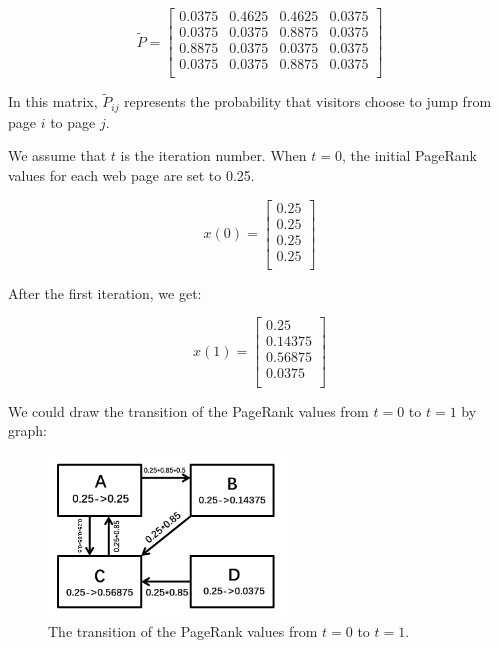 \documentclass[lettersize,journal,12pt,conference]{IEEEtran}
\begin{document}
\begin{equation}
	\label{eq:13}
	\widetilde{P} = \begin{bmatrix}
		0.0375 & 0.4625 & 0.4625 & 0.0375 \\
		0.0375 & 0.0375 & 0.8875 & 0.0375 \\
		0.8875 & 0.0375 & 0.0375 & 0.0375 \\
		0.0375 & 0.0375 & 0.8875 & 0.0375 \\
	\end{bmatrix}
\end{equation}

In this matrix, $\widetilde{P}_{ij}$ represents the probability that visitors choose to jump from page $i$ to page $j$.

We assume that $t$ is the iteration number. When $t = 0$, the initial PageRank values for each web page are set to 0.25.

\begin{equation}
	\label{eq:14}
	x(0) = \begin{bmatrix}
		0.25 \\
		0.25 \\
		0.25 \\
		0.25 \\
	\end{bmatrix}
\end{equation}

After the first iteration, we get:

\begin{equation}
	\label{eq:15}
	x(1) = \begin{bmatrix}
		0.25    \\
		0.14375 \\
		0.56875 \\
		0.0375  \\
	\end{bmatrix}
\end{equation}

We could draw the transition of the PageRank values from $t = 0$ to $t = 1$ by graph:

\begin{figure}[h]
	\centering
	\includegraphics[width=2.5in]{images/fig6.png}
	\caption{The transition of the PageRank values from $t = 0$ to $t = 1$.}
	\label{fig6}
\end{figure}
\end{document}
